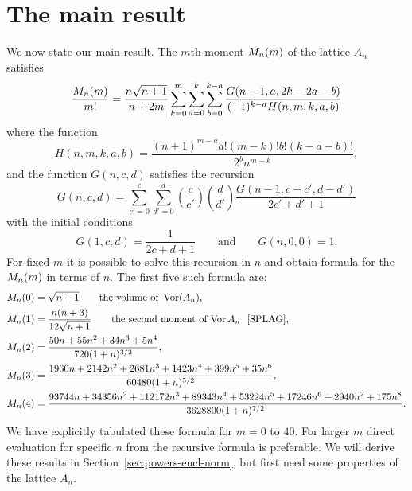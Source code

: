 \documentclass[draftcls, onecolumn, 11pt]{IEEEtran}
\begin{document}
\section{The main result}\label{sec:main-result}

We now state our main result.  The $m$th moment $M_n(m)$ of the lattice $A_n$ satisfies
\begin{equation}\label{eq:theCmformula}
\frac{\calM_n(m)}{m!} = \frac{n\sqrt{n+1}}{n+2m}\sum_{k=0}^{m}\sum_{a =0}^{k}\sum_{b=0}^{k-a} \frac{G(n-1,a,2k - 2a - b)}{(-1)^{k-a}H(n,m,k,a,b)}
\end{equation}
where the function
\[
H(n,m,k,a,b) = \frac{(n+1)^{m-a}a!(m-k)!b! (k-a-b)!}{2^{b} n^{m-k}},
\]
and the function $G(n,c,d)$ satisfies the recursion
\begin{equation}\label{eq:theGrecursion}
G(n,c,d) = \sum_{c'=0}^{c} \sum_{d'=0}^{d} \binom{c}{c'}\binom{d}{d'} \frac{G(n-1,c-c',d-d')}{2c'+d'+1}
\end{equation}
with the initial conditions
\[
G(1,c,d) = \frac{1}{2c+d+1} \qquad \text{and} \qquad G(n,0,0) = 1.
\]
For fixed $m$ it is possible to solve this recursion in $n$ and obtain formula for the $M_n(m)$ in terms of $n$.  The first five such formula are:
\begin{align*}
\calM_n(0) &= \sqrt{n+1} \qquad \text{the volume of } \vor(A_n),\\
\calM_n(1) &= \frac{n(n+3)}{12\sqrt{n+1}} \qquad \text{the second moment of $\vor{A_n}$~ \cite[p. 462]{SPLAG}}, \\
\calM_n(2) &=  \frac{50 n + 55 n^2 + 34 n^3 + 5 n^4}{720 (1 + n)^{3/2}}, \\
\calM_n(3) &= \frac{1960 n + 2142 n^2 + 2681 n^3 + 1423 n^4 + 399 n^5 + 35 n^6}{60480 (1 + n)^{5/2}}, \\
\calM_n(4) &= \frac{93744 n + 34356 n^2 + 112172 n^3 + 89343 n^4 + 53224 n^5 + 17246 n^6 + 2940 n^7 + 175 n^8}{3628800 (1 + n)^{7/2}}.
\end{align*}
We have explicitly tabulated these formula for $m=0$ to $40$. For larger $m$ direct evaluation for specific $n$ from the recursive formula is preferable.  We will derive these results in Section~\ref{sec:powers-eucl-norm}, but first need some properties of the lattice $A_n$.
\end{document}
